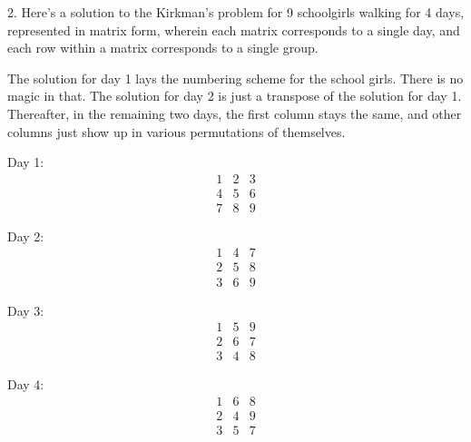 \documentclass{article}
\begin{document}
2. Here's a solution to the Kirkman's problem for 9 schoolgirls walking for 4 days, represented in matrix form, wherein each matrix corresponds to a single day, and each row within a matrix corresponds to a single group.

The solution for day 1 lays the numbering scheme for the school girls. There is no magic in that. The solution for day 2 is just a transpose of the solution for day 1. Thereafter, in the remaining two days, the first column stays the same, and other columns just show up in various permutations of themselves.

Day 1:
\[
\begin{matrix}
    1 & 2 & 3\\
    4 & 5 & 6\\
    7 & 8 & 9
\end{matrix}
\]

Day 2:
\[
\begin{matrix}
    1 & 4 & 7\\
    2 & 5 & 8\\
    3 & 6 & 9
\end{matrix}
\]

Day 3:
\[
\begin{matrix}
    1 & 5 & 9\\
    2 & 6 & 7\\
    3 & 4 & 8
\end{matrix}
\]

Day 4:
\[
\begin{matrix}
    1 & 6 & 8\\
    2 & 4 & 9\\
    3 & 5 & 7
\end{matrix}
\]
\end{document}
